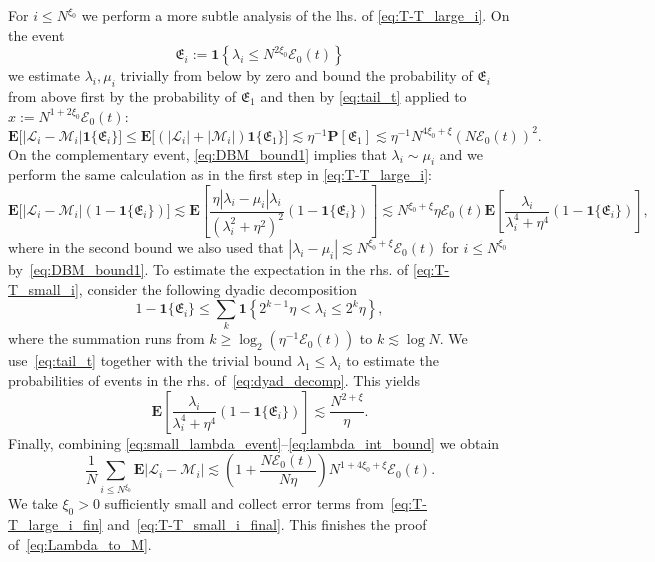 \documentclass[10pt]{amsart}
\numberwithin{equation}{section}
\newcommand{\E}{\mathbf{E}}
\begin{document}
For $i\le N^{\xi_0}$ we perform a more subtle analysis of the lhs. of \eqref{eq:T-T_large_i}. On the event 
\begin{equation*}
\mathfrak{E}_i := \bm{1}\left\lbrace \lambda_i \le N^{2\xi_0}\mathcal{E}_0(t)\right\rbrace
\end{equation*}
we estimate $\lambda_i, \mu_i$ trivially from below by zero and bound the probability of $\mathfrak{E}_i$ from above first by the probability of $\mathfrak{E}_1$ and then by \eqref{eq:tail_t} applied to $x:=N^{1+2\xi_0}\mathcal{E}_0(t)$:
\begin{equation}
\E\big[|\mathscr{L}_i-\mathscr{M}_i|\bm{1}\{\mathfrak{E}_i\}\big]\le \E\big[\left(|\mathscr{L}_i|+|\mathscr{M}_i|\right)\bm{1}\{\mathfrak{E}_1\}\big]\lesssim \eta^{-1}\mathbf{P}\left[\mathfrak{E}_1\right]\lesssim \eta^{-1}N^{4\xi_0+\xi}(N\mathcal{E}_0(t))^2.
\label{eq:small_lambda_event}
\end{equation}
On the complementary event, \eqref{eq:DBM_bound1} implies that $\lambda_i\sim\mu_i$ and we perform the same calculation as in the first step in \eqref{eq:T-T_large_i}:
\begin{equation}
\E \big[\left\vert \mathscr{L}_i-\mathscr{M}_i\right\vert\left(1-\bm{1}\{\mathfrak{E}_i\}\right)\big]\!\lesssim\! \E \left[\!\frac{\eta |\lambda_i-\mu_i|\lambda_i}{\left(\lambda_i^2 +\eta^2\right)^2}(1-\bm{1}\{\mathfrak{E}_i\})\!\right]\!\lesssim\! N^{\xi_0+\xi}\eta\mathcal{E}_0(t)\E \left[\!\frac{\lambda_i}{\lambda_i^4+\eta^4}(1-\bm{1}\{\mathfrak{E}_i\})\!\right]\!,
\label{eq:T-T_small_i}
\end{equation}
where in the second bound we also used that $|\lambda_i-\mu_i|\lesssim N^{\xi_0+\xi}\mathcal{E}_0(t)$ for $i\le N^{\xi_0}$ by~\eqref{eq:DBM_bound1}. To estimate the expectation in the rhs. of \eqref{eq:T-T_small_i}, consider the following dyadic decomposition
\begin{equation}
1-\bm{1}\{\mathfrak{E}_i\} \le \sum_k \bm{1}\left\lbrace 2^{k-1}\eta< \lambda_i\le 2^k\eta\right\rbrace,
\label{eq:dyad_decomp}
\end{equation}
where the summation runs from $k\ge \log_2(\eta^{-1}\mathcal{E}_0(t))$ to $k\lesssim \log N$. We use~\eqref{eq:tail_t} together with the trivial bound $\lambda_1\le \lambda_i$ to estimate the probabilities of events in the rhs. of~\eqref{eq:dyad_decomp}. This yields
\begin{equation}
\E \left[\frac{\lambda_i}{\lambda_i^4+\eta^4}(1-\bm{1}\{\mathfrak{E}_i\})\right]\lesssim\frac{N^{2+\xi}}{\eta}.
\label{eq:lambda_int_bound}
\end{equation}
Finally, combining \eqref{eq:small_lambda_event}--\eqref{eq:lambda_int_bound} we obtain
\begin{equation}
\frac{1}{N} \sum_{i\le N^{\xi_0}} \E |\mathscr{L}_i-\mathscr{M}_i|\lesssim \left(1 + \frac{N\mathcal{E}_0(t)}{N\eta}\right)N^{1+4\xi_0+\xi}\mathcal{E}_0(t).
\label{eq:T-T_small_i_final}
\end{equation}
We take $\xi_0>0$ sufficiently small and collect error terms from~\eqref{eq:T-T_large_i_fin} and~\eqref{eq:T-T_small_i_final}. This finishes the proof of~\eqref{eq:Lambda_to_M}.
\end{document}
